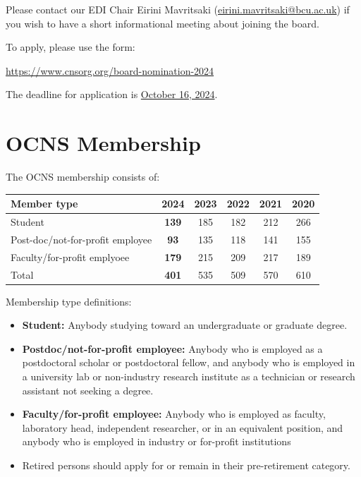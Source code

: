 \documentclass[11pt,a4paper,oneside]{article}
\begin{document}
Please contact our EDI Chair Eirini Mavritsaki (\href{mailto:eirini.mavritsaki@bcu.ac.uk}{eirini.mavritsaki@bcu.ac.uk}) if you wish to have a short informational meeting about joining the board.

To apply, please use the form:

\begin{center}
\url{https://www.cnsorg.org/board-nomination-2024}
\end{center}

The deadline for application is \underline{October 16, 2024}.

\clearpage
\section*{OCNS Membership}%

The OCNS membership consists of:
\begin{table}[!h]
  \centering
  \begin{tabularx}{0.7\textwidth}{X|ccccc}
    \textbf{Member type}& \textbf{2024} & \textbf{2023} & \textbf{2022} & \textbf{2021} & \textbf{2020} \\
    \toprule{}
    Student & \textbf{139} &  185 & 182 & 212 & 266 \\
    Post-doc/not-for-profit employee & \textbf{93} & 135 & 118 & 141 & 155 \\
    Faculty/for-profit emplyoee & \textbf{179} & 215 & 209 & 217 & 189 \\
    \midrule{}
    Total & \textbf{401} & 535 & 509 & 570 & 610 \\
  \end{tabularx}
\end{table}

Membership type definitions:
\begin{itemize}
  \item \textbf{Student:} Anybody studying toward an undergraduate or graduate degree.
  \item \textbf{Postdoc/not-for-profit employee:} Anybody who is employed as a postdoctoral scholar or postdoctoral fellow, and anybody who is employed in a university lab or non-industry research institute as a technician or research assistant not seeking a degree.
  \item \textbf{Faculty/for-profit employee:} Anybody who is employed as faculty, laboratory head, independent researcher, or in an equivalent position, and anybody who is employed in industry or for-profit institutions
  \item Retired persons should apply for or remain in their pre-retirement category.
\end{itemize}
\end{document}
